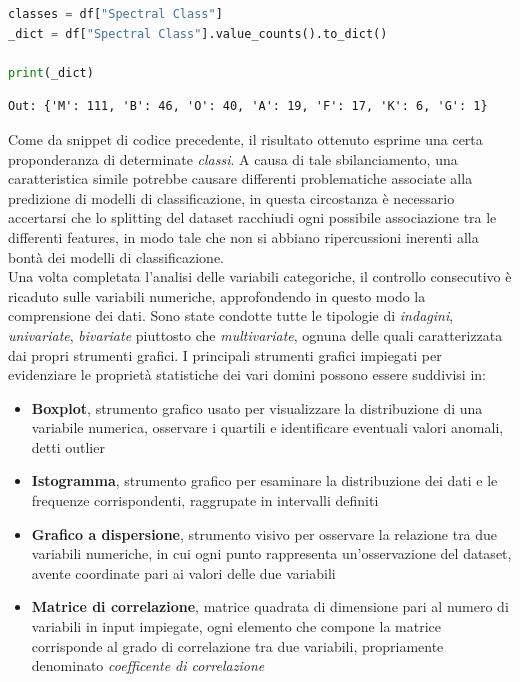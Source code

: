 \documentclass{article}
\begin{document}
    \begin{lstlisting}[language=Python]
classes = df["Spectral Class"]
_dict = df["Spectral Class"].value_counts().to_dict()

print(_dict)
    \end{lstlisting}
    \begin{lstlisting}[style=Jupyter]
Out: {'M': 111, 'B': 46, 'O': 40, 'A': 19, 'F': 17, 'K': 6, 'G': 1}
    \end{lstlisting}
    Come da snippet di codice precedente, il risultato ottenuto esprime una certa proponderanza di determinate \textit{classi}. A causa di tale sbilanciamento, una caratteristica simile potrebbe causare differenti problematiche associate alla predizione di modelli di classificazione, in questa circostanza è necessario accertarsi che lo splitting del dataset racchiudi ogni possibile associazione tra le differenti features, in modo tale che non si abbiano ripercussioni inerenti alla bontà dei modelli di classificazione. \vspace*{7pt}\\
    Una volta completata l'analisi delle variabili categoriche, il controllo consecutivo è ricaduto sulle variabili numeriche, approfondendo in questo modo la comprensione dei dati. Sono state condotte tutte le tipologie di \textit{indagini}, \textit{univariate}, \textit{bivariate} piuttosto che \textit{multivariate}, ognuna delle quali caratterizzata dai propri strumenti grafici. I principali strumenti grafici impiegati per evidenziare le proprietà statistiche dei vari domini possono essere suddivisi in:
     \begin{itemize}
        \renewcommand{\labelitemi}{-}
        \setlength\parskip{0pt}
        \item \textbf{Boxplot}, strumento grafico usato per visualizzare la distribuzione di una variabile numerica, osservare i quartili e identificare eventuali valori anomali, detti outlier
        \item \textbf{Istogramma}, strumento grafico per esaminare la distribuzione dei dati e le frequenze corrispondenti, raggrupate in intervalli definiti
        \item \textbf{Grafico a dispersione}, strumento visivo per osservare la relazione tra due variabili numeriche, in cui ogni punto rappresenta un'osservazione del dataset, avente coordinate pari ai valori delle due variabili
        \item \textbf{Matrice di correlazione}, matrice quadrata di dimensione pari al numero di variabili in input impiegate, ogni elemento che compone la matrice corrisponde al grado di correlazione tra due variabili, propriamente denominato \textit{coefficente di correlazione}
    \end{itemize}
\end{document}
